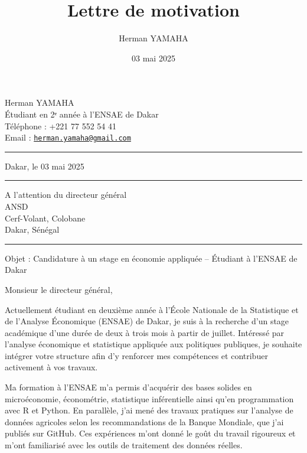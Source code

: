 \documentclass[
  13pt,
]{article}
\title{Lettre de motivation}
\author{Herman YAMAHA}
\date{03 mai 2025}
\begin{document}
\maketitle

Herman YAMAHA\\
Étudiant en 2ᵉ année à l'ENSAE de Dakar\\
Téléphone : +221 77 552 54 41\\
Email :
\href{mailto:herman.yamaha@gmail.com}{\nolinkurl{herman.yamaha@gmail.com}}

\begin{center}\rule{0.5\linewidth}{0.5pt}\end{center}

\begin{flushright}
Dakar, le 03 mai 2025  
\end{flushright}

\begin{center}\rule{0.5\linewidth}{0.5pt}\end{center}

\begin{flushright}
A l'attention du directeur général \\
              ANSD \\
   Cerf-Volant, Colobane \\
       Dakar, Sénégal
\end{flushright}

\begin{center}\rule{0.5\linewidth}{0.5pt}\end{center}

Objet : Candidature à un stage en économie appliquée -- Étudiant à
l'ENSAE de Dakar

Monsieur le directeur général,

Actuellement étudiant en deuxième année à l'École Nationale de la
Statistique et de l'Analyse Économique (ENSAE) de Dakar, je suis à la
recherche d'un stage académique d'une durée de deux à trois mois à
partir de juillet. Intéressé par l'analyse économique et statistique
appliquée aux politiques publiques, je souhaite intégrer votre structure
afin d'y renforcer mes compétences et contribuer activement à vos
travaux.

Ma formation à l'ENSAE m'a permis d'acquérir des bases solides en
microéconomie, économétrie, statistique inférentielle ainsi qu'en
programmation avec R et Python. En parallèle, j'ai mené des travaux
pratiques sur l'analyse de données agricoles selon les recommandations
de la Banque Mondiale, que j'ai publiés sur GitHub. Ces expériences
m'ont donné le goût du travail rigoureux et m'ont familiarisé avec les
outils de traitement des données réelles.
\end{document}
